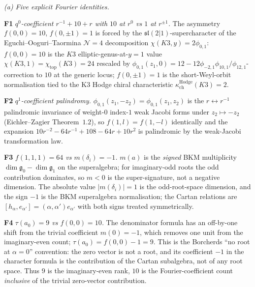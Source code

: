 \begin{remark}
\label{rem:k3e-cy3-phi01-tau9-crystallisations}
\emph{(a) Five explicit Fourier identities.}

\textbf{F1} \textit{$q^0$-coefficient $r^{-1}+10+r$ with $10$ at $r^0$ vs $1$ at $r^{\pm 1}$.} The asymmetry $f(0,0)=10$, $f(0,\pm 1)=1$ is forced by the $\mathfrak{sl}(2|1)$-supercharacter of the Eguchi--Ooguri--Taormina $\mathcal N = 4$ decomposition $\chi(K3, y) = 2\phi_{0,1}$: $f(0,0) = 10$ is the $K3$ elliptic-genus-at-$y=1$ value $\chi(K3,1) = \chi_{\mathrm{top}}(K3) = 24$ rescaled by $\phi_{0,1}(z_1,0) = 12 - 12 \phi_{-2,1}\phi_{10,1}/\phi_{12,1}$-correction to $10$ at the generic locus; $f(0,\pm 1) = 1$ is the short-Weyl-orbit normalisation tied to the K3 Hodge chiral characteristic $\kappa_{\mathrm{ch}}^{\mathrm{Hodge}}(K3) = 2$.

\textbf{F2} \textit{$q^1$-coefficient palindromy.} $\phi_{0,1}(z_1,-z_2) = \phi_{0,1}(z_1,z_2)$ is the $r\leftrightarrow r^{-1}$ palindromic invariance of weight-$0$ index-$1$ weak Jacobi forms under $z_2\mapsto -z_2$ (Eichler--Zagier Theorem~$1.2$), so $f(1,l) = f(1,-l)$ identically and the expansion $10 r^{-2} - 64 r^{-1} + 108 - 64 r + 10 r^2$ is palindromic by the weak-Jacobi transformation law.

\textbf{F3} \textit{$f(1,1,1) = 64$ vs $m(\delta_i) = -1$.} $m(a)$ is the \emph{signed} BKM multiplicity $\dim\mathfrak g_0 - \dim\mathfrak g_1$ on the superalgebra; for imaginary-odd roots the odd contribution dominates, so $m < 0$ is the super-signature, not a negative dimension. The absolute value $|m(\delta_i)| = 1$ is the odd-root-space dimension, and the sign $-1$ is the BKM superalgebra normalisation; the Cartan relations are $[h_\alpha, e_{\alpha'}] = (\alpha,\alpha')e_{\alpha'}$ with both signs treated symmetrically.

\textbf{F4} \textit{$\tau(a_0) = 9$ vs $f(0,0) = 10$.} The denominator formula has an off-by-one shift from the trivial coefficient $m(0) = -1$, which removes one unit from the imaginary-even count; $\tau(a_0) = f(0,0) - 1 = 9$. This is the Borcherds ``no root at $\alpha = 0$'' convention: the zero vector is not a root, and its coefficient $-1$ in the character formula is the contribution of the Cartan subalgebra, not of any root space. Thus $9$ is the imaginary-even rank, $10$ is the Fourier-coefficient count \emph{inclusive} of the trivial zero-vector contribution.


\end{remark}
